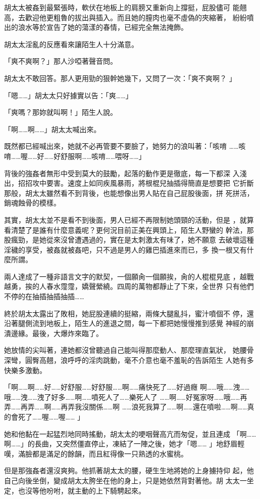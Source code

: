 胡太太被姦到最緊張時，軟伏在地板上的肩膀又重新向上撐挺，屁股儘可
能翹高，去歡迎他更粗魯的拔出與插入。而且她的膣肉也毫不虛偽的夾縮著，
紛紛噴出的浪水等於宣告了她的蕩漾的春情，已經完全無法掩飾。

胡太太淫亂的反應看來讓陌生人十分滿意。

「爽不爽啊？」那人沙啞著聲音問。

胡太太不敢回答。那人更用勁的狠幹她幾下，又問了一次：「爽不爽啊？
」

「嗯……」胡太太只好據實以告：「爽……」

「爽嗎？那妳就叫啊！」陌生人說。

「啊……啊……」胡太太喊出來。

既然都已經喊出來，她就不必再管要不要臉了，她努力的浪叫著：「咳唷
……咳唷……喔……好……好舒服啊……咳唷……喂呀……」

背後的強姦者無形中受到莫大的鼓勵，起落的動作更是徹底，每一下都深
入淺出，招招攻中要害。速度上如同疾風暴雨，將根棍兒抽插得簡直是想要把
它折斷那般，胡太太雖然看不到背後，也能想像出男人貼在自己屁股後面，拼
死拼活，銷魂蝕骨的模樣。

其實，胡太太並不是看不到後面，男人已經不再限制她頭頸的活動，但是
，就算看清楚了是誰有什麼意義呢？更何況目前正美在興頭上，陌生人野蠻的
幹法，那股瘋勁，是她從來沒曾遭遇過的，實在是太刺激太有味了，她不願意
去破壞這種淫穢的享受，被姦就被姦吧，只不過是男人的雞巴插進來而已，多
換一根又有什麼所謂。

兩人達成了一種非語言文字的默契，一個願肏一個願挨，肏的人棍棍見底
，越戰越勇，挨的人春水霪霪，嬌聲縈繞。四周的萬物都靜止了下來，全世界
只有他們不停的在抽插抽插抽插……

終於胡太太露出了敗相，她屁股連續的挺縮，兩條大腿亂抖，蜜汁噴個不
停，還沿著腿側流到地板上，陌生人的進退之間，每一下都把她慢慢推到感覺
神經的崩潰邊緣。最後，大爆炸來臨了。

她放情的尖叫著，連她都沒曾聽過自己能叫得那麼動人、那麼理直氣狀，
她腰骨深彎，圓臀高翹，浪呼呼的淫肉跳動，毫不介意也毫不羞恥的告訴陌生
人她有多快樂多激動。

「啊……啊……好……好舒服……好舒服……啊……痛快死了……好過癮
啊……哦……洩……哦……洩……洩了好多……啊……噴死人了……樂死人了
……啊……好冤家呀……哦……再弄……再弄……啊……再弄我沒關係……啊
……浪死我算了……啊……還在噴啦……啊……真的會死了……喔……喔……
」

她和他黏在一起猛烈地同時搖動，胡太太的哽咽聲高亢而匆促，並且連成
「啊……啊……」的長曲，又突然僵直停止，凍結了一陣之後，她才「嗯……
」地舒眉輕嘆，滿臉都是滿足的餘韻，而且紅得像一只熟透的水蜜桃。

但是那強姦者還沒爽夠。他抓著胡太太的腰，硬生生地將她的上身擄持仰
起，他自己向後坐倒，變成胡太太胯坐在他的身上，只是她依然背對著他。胡
太太一坐定，也沒等他吩咐，就主動的上下騎騁起來。

